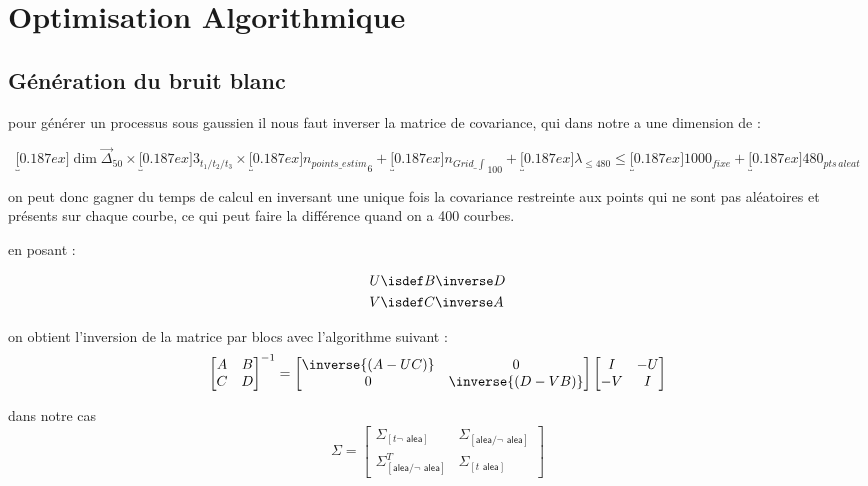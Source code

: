 \section{Optimisation Algorithmique}

\subsection{Génération du bruit blanc}

pour générer un processus sous gaussien il nous faut inverser la matrice de covariance, qui dans notre a une dimension de :

\begin{equation*}
	\underbracket[0.187ex]{\dim \vec\Delta}_{50} \times \underbracket[0.187ex]{3}_{t_1 / t_2 / t_3} \times \underbracket[0.187ex]{n_{points\_estim}}_{6} + \underbracket[0.187ex]{n_{Grid\_\int}}_{100} + \underbracket[0.187ex]{\lambda}_{\leq 480} \leq \underbracket[0.187ex]{1000}_{fixe} + \underbracket[0.187ex]{480}_{pts \, aleat}
\end{equation*}

on peut donc gagner du temps de calcul en inversant une unique fois la covariance restreinte aux points qui ne sont pas aléatoires et présents sur chaque courbe, ce qui peut faire la différence quand on a 400 courbes.

en posant :


\begin{align*}
	U & \isdef B \inverse D \\
	V & \isdef C \inverse A
\end{align*}


on obtient l'inversion de la matrice par blocs avec l'algorithme suivant :
\begin{equation*}
	\begin{bmatrix}
		A & B \\
		C & D
	\end{bmatrix}^{-1}
	=
	\begin{bmatrix}
		\inverse{(A - UC)} & 0                  \\
		0                  & \inverse{(D - VB)}
	\end{bmatrix}
	\begin{bmatrix}
		I   & - U \\
		- V & I
	\end{bmatrix}
\end{equation*}

dans notre cas
\begin{equation*}
	\Sigma = \begin{bmatrix}
		\Sigma_{[t \neg\textsf{ alea}]} & \Sigma_{[\textsf{alea} / \neg \textsf{ alea}]}
		\\ \Sigma^T_{[\textsf{alea} / \neg \textsf{ alea}]}
		                                & \Sigma_{[t \textsf{ alea}]}
	\end{bmatrix}
\end{equation*}

